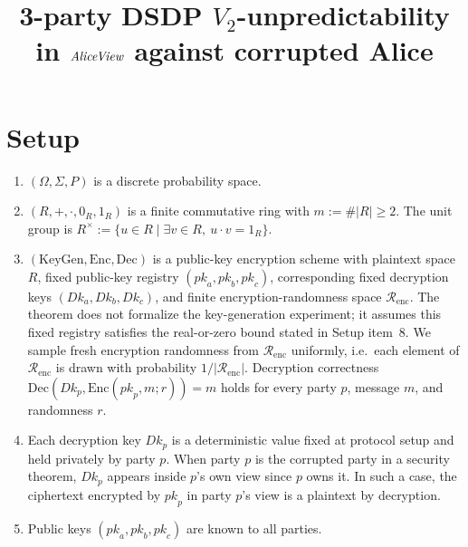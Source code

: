 \documentclass[11pt]{article}
\title{3-party DSDP $V_2$-unpredictability in $\mathit{AliceView}$ against corrupted Alice}
\author{}
\date{}
\newcommand{\Renc}{\mathcal{R}_{\mathrm{enc}}}
\newcommand{\Encf}{\mathrm{Enc}}
\newcommand{\Decf}{\mathrm{Dec}}
\newcommand{\KeyGen}{\mathrm{KeyGen}}
\newcommand{\Dk}{\mathit{Dk}}
\newcommand{\pk}{\mathit{pk}}
\begin{document}
\maketitle

\section*{Setup}

\begin{enumerate}
\item $(\Omega, \Sigma, P)$ is a discrete probability space.

\item $(R, +, \cdot, 0_R, 1_R)$ is a finite commutative ring with $m := \#|R| \geq 2$. The unit group is $R^\times := \{ u \in R \mid \exists v \in R,\ u \cdot v = 1_R \}$.

\item $(\KeyGen, \Encf, \Decf)$ is a public-key encryption scheme with plaintext space $R$, fixed public-key registry $(\pk_a, \pk_b, \pk_c)$, corresponding fixed decryption keys $(\Dk_a, \Dk_b, \Dk_c)$, and finite encryption-randomness space $\Renc$. The theorem does not formalize the key-generation experiment; it assumes this fixed registry satisfies the real-or-zero bound stated in Setup item~8. We sample fresh encryption randomness from $\Renc$ uniformly, i.e.\ each element of $\Renc$ is drawn with probability $1 / |\Renc|$. Decryption correctness $\Decf(\Dk_p, \Encf(\pk_p, m; r)) = m$ holds for every party $p$, message $m$, and randomness $r$.

\item Each decryption key $\Dk_p$ is a deterministic value fixed at protocol setup and held privately by party $p$. When party $p$ is the corrupted party in a security theorem, $\Dk_p$ appears inside $p$'s own view since $p$ owns it. In such a case, the ciphertext encrypted by $\pk_p$ in party $p$'s view is a plaintext by decryption.

\item Public keys $(\pk_a, \pk_b, \pk_c)$ are known to all parties.


\end{enumerate}
\end{document}
